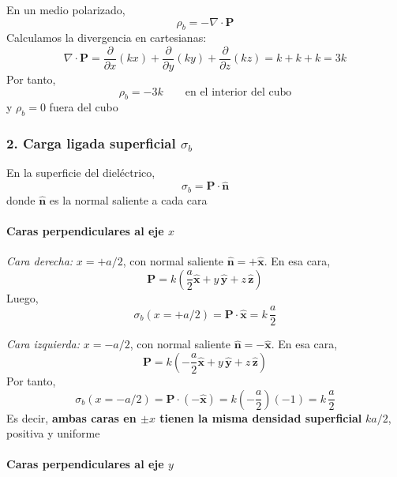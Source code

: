 \documentclass{article}
\begin{document}
En un medio polarizado,
\begin{equation}
\rho_{b} = -\nabla\cdot\mathbf{P}
\label{eq:rho-b-def-cubo}
\end{equation}
Calculamos la divergencia en cartesianas:
\[
\nabla\cdot\mathbf{P}
= \frac{\partial}{\partial x}(kx)
+ \frac{\partial}{\partial y}(ky)
+ \frac{\partial}{\partial z}(kz)
= k + k + k = 3k
\]
Por tanto,
\begin{equation}
\rho_{b} = -3k
\qquad \text{en el interior del cubo}
\label{eq:rho-b-cubo}
\end{equation}
y $\rho_{b}=0$ fuera del cubo

\subsubsection*{2. Carga ligada superficial $\sigma_{b}$}

En la superficie del dieléctrico,
\begin{equation}
\sigma_{b} = \mathbf{P}\cdot\hat{\mathbf{n}}
\label{eq:sigma-b-def-cubo}
\end{equation}
donde $\hat{\mathbf{n}}$ es la normal saliente a cada cara

\paragraph{Caras perpendiculares al eje $x$}

\emph{Cara derecha:} $x = +a/2$, con normal saliente $\hat{\mathbf{n}} = +\hat{\mathbf{x}}$.  
En esa cara,
\[
\mathbf{P} = k\left(\frac{a}{2}\hat{\mathbf{x}} + y\,\hat{\mathbf{y}} + z\,\hat{\mathbf{z}}\right)
\]
Luego,
\begin{equation}
\sigma_{b}(x=+a/2)
= \mathbf{P}\cdot\hat{\mathbf{x}}
= k\,\frac{a}{2}
\label{eq:sigma-x-mas}
\end{equation}

\emph{Cara izquierda:} $x = -a/2$, con normal saliente $\hat{\mathbf{n}} = -\hat{\mathbf{x}}$.  
En esa cara,
\[
\mathbf{P} = k\left(-\frac{a}{2}\hat{\mathbf{x}} + y\,\hat{\mathbf{y}} + z\,\hat{\mathbf{z}}\right)
\]
Por tanto,
\begin{equation}
\sigma_{b}(x=-a/2)
= \mathbf{P}\cdot(-\hat{\mathbf{x}})
= k\left(-\frac{a}{2}\right)(-1)
= k\,\frac{a}{2}
\label{eq:sigma-x-menos}
\end{equation}
Es decir, \textbf{ambas caras en $\pm x$ tienen la misma densidad superficial} $k a/2$, positiva y uniforme

\paragraph{Caras perpendiculares al eje $y$}
\end{document}
